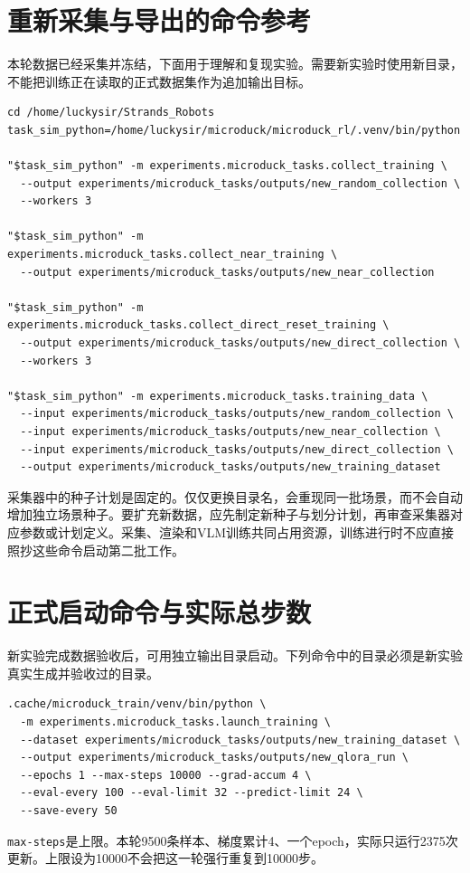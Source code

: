 \section{重新采集与导出的命令参考}
本轮数据已经采集并冻结，下面用于理解和复现实验。需要新实验时使用新目录，不能把训练正在读取的正式数据集作为追加输出目标。

\begin{Verbatim}
cd /home/luckysir/Strands_Robots
task_sim_python=/home/luckysir/microduck/microduck_rl/.venv/bin/python

"$task_sim_python" -m experiments.microduck_tasks.collect_training \
  --output experiments/microduck_tasks/outputs/new_random_collection \
  --workers 3

"$task_sim_python" -m experiments.microduck_tasks.collect_near_training \
  --output experiments/microduck_tasks/outputs/new_near_collection

"$task_sim_python" -m experiments.microduck_tasks.collect_direct_reset_training \
  --output experiments/microduck_tasks/outputs/new_direct_collection \
  --workers 3

"$task_sim_python" -m experiments.microduck_tasks.training_data \
  --input experiments/microduck_tasks/outputs/new_random_collection \
  --input experiments/microduck_tasks/outputs/new_near_collection \
  --input experiments/microduck_tasks/outputs/new_direct_collection \
  --output experiments/microduck_tasks/outputs/new_training_dataset
\end{Verbatim}

采集器中的种子计划是固定的。仅仅更换目录名，会重现同一批场景，而不会自动增加独立场景种子。要扩充新数据，应先制定新种子与划分计划，再审查采集器对应参数或计划定义。采集、渲染和VLM训练共同占用资源，训练进行时不应直接照抄这些命令启动第二批工作。

\section{正式启动命令与实际总步数}
新实验完成数据验收后，可用独立输出目录启动。下列命令中的目录必须是新实验真实生成并验收过的目录。
\begin{Verbatim}
.cache/microduck_train/venv/bin/python \
  -m experiments.microduck_tasks.launch_training \
  --dataset experiments/microduck_tasks/outputs/new_training_dataset \
  --output experiments/microduck_tasks/outputs/new_qlora_run \
  --epochs 1 --max-steps 10000 --grad-accum 4 \
  --eval-every 100 --eval-limit 32 --predict-limit 24 \
  --save-every 50
\end{Verbatim}
\texttt{max-steps}是上限。本轮9500条样本、梯度累计4、一个epoch，实际只运行2375次更新。上限设为10000不会把这一轮强行重复到10000步。

